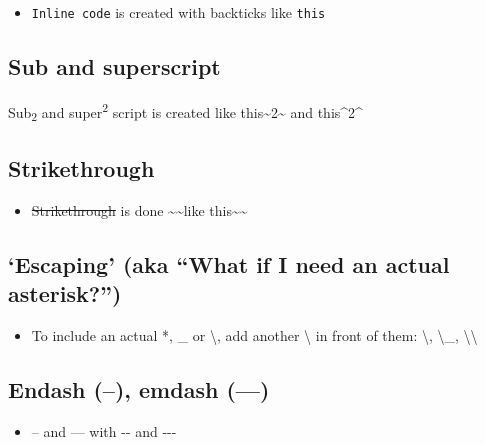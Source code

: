 \documentclass[a4paper, twoside]{templates/ociamthesis}
\providecommand{\tightlist}{%
  \setlength{\itemsep}{0pt}\setlength{\parskip}{0pt}}
\begin{document}
\begin{itemize}
\tightlist
\item
  \texttt{Inline\ code} is created with backticks like \texttt{\textasciigrave{}this\textasciigrave{}}
\end{itemize}

\hypertarget{sub-and-superscript}{%
\subsection{Sub and superscript}\label{sub-and-superscript}}

Sub\textsubscript{2} and super\textsuperscript{2} script is created like this\textasciitilde2\textasciitilde{} and this\^{}2\^{}

\hypertarget{strikethrough}{%
\subsection{Strikethrough}\label{strikethrough}}

\begin{itemize}
\tightlist
\item
  \sout{Strikethrough} is done \textasciitilde\textasciitilde like this\textasciitilde\textasciitilde{}
\end{itemize}

\hypertarget{escaping-aka-what-if-i-need-an-actual-asterisk}{%
\subsection{`Escaping' (aka ``What if I need an actual asterisk?'')}\label{escaping-aka-what-if-i-need-an-actual-asterisk}}

\begin{itemize}
\tightlist
\item
  To include an actual *, \_ or \textbackslash, add another \textbackslash{} in front of them: \textbackslash*, \textbackslash\_, \textbackslash\textbackslash{}
\end{itemize}

\hypertarget{endash-emdash}{%
\subsection{Endash (--), emdash (---)}\label{endash-emdash}}

\begin{itemize}
\tightlist
\item
  -- and --- with -\/- and -\/-\/-
\end{itemize}
\end{document}
